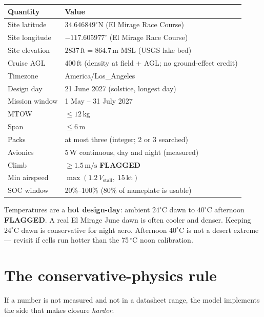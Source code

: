 \documentclass[11pt,letterpaper]{article}
\newcommand{\flag}{\textcolor{red!60!black}{\textbf{FLAGGED}}}
\begin{document}
\begin{center}
\begin{tabular}{@{}ll@{}}
\toprule
Quantity & Value \\
\midrule
Site latitude & $34.646849^\circ\mathrm{N}$ (El Mirage Race Course) \\
Site longitude & $-117.605977^\circ$ (El Mirage Race Course) \\
Site elevation & $2837\,\mathrm{ft} = 864.7\,\mathrm{m}$ MSL (USGS lake bed) \\
Cruise AGL & $400\,\mathrm{ft}$ (density at field + AGL; no ground-effect credit) \\
Timezone & America/Los\_Angeles \\
Design day & 21 June 2027 (solstice, longest day) \\
Mission window & 1 May -- 31 July 2027 \\
MTOW & $\le 12\,\mathrm{kg}$ \\
Span & $\le 6\,\mathrm{m}$ \\
Packs & at most three (integer; 2 or 3 searched) \\
Avionics & $5\,\mathrm{W}$ continuous, day and night (measured) \\
Climb & $\ge 1.5\,\mathrm{m/s}$ \flag{} \\
Min airspeed & $\max(1.2\,V_\mathrm{stall},\; 15\,\mathrm{kt})$ \\
SOC window & 20\%--100\% (80\% of nameplate is usable) \\
\bottomrule
\end{tabular}
\end{center}

Temperatures are a \textbf{hot design-day}: ambient $24^\circ\mathrm{C}$ dawn to $40^\circ\mathrm{C}$ afternoon \flag{}. A real El Mirage June dawn is often cooler and denser. Keeping $24^\circ\mathrm{C}$ dawn is conservative for night aero. Afternoon $40^\circ\mathrm{C}$ is not a desert extreme --- revisit if cells run hotter than the 75\,$^\circ\mathrm{C}$ noon calibration.

\section{The conservative-physics rule}

If a number is not measured and not in a datasheet range, the model implements the side that makes closure \emph{harder}.
\end{document}

